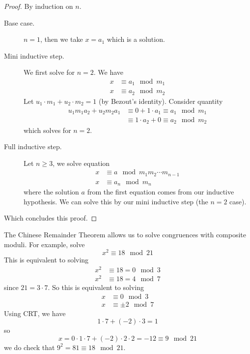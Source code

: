 \begin{proof}
    By induction on $n$.
    \begin{description}
        \item[Base case.] $n = 1$, then we take $x = a_1$ which is a solution.
        \item[Mini inductive step.] We first solve for $n=2$. We have
            \begin{align*}
                x & \equiv a_1\mod m_1 \\
                x & \equiv a_2\mod m_2
            \end{align*}
            Let $u_1\cdot m_1 + u_2\cdot m_2 = 1$ (by Bezout's identity). Consider quantity
            \begin{align*}
                u_1m_1a_2 + u_2m_2a_1 & \equiv 0 + 1\cdot a_1 \equiv a_1 \mod m_1 \\
                                      & \equiv 1\cdot a_2 + 0 \equiv a_2\mod m_2
            \end{align*}
            which solves for $n=2$.
        \item[Full inductive step.] Let $n\geq 3$, we solve equation
            \begin{align*}
                x & \equiv a\mod m_1m_2\cdots m_{n-1} \\
                x & \equiv a_{n}\mod m_{n}
            \end{align*}
            where the solution $a$ from the first equation comes from our inductive hypothesis. We can solve this by our mini inductive step (the $n=2$ case).
    \end{description}
    Which concludes this proof.
\end{proof}

\begin{example}
    The Chinese Remainder Theorem allows us to solve congruences with composite moduli. For example, solve
    \[x^2\equiv 18 \mod 21\]
    This is equivalent to solving
    \begin{align*}
        x^2 & \equiv 18 = 0\mod 3 \\
        x^2 & \equiv 18 = 4\mod 7
    \end{align*}
    since $21 = 3\cdot 7$. So this is equivalent to solving
    \begin{align*}
        x & \equiv 0\mod 3     \\
        x & \equiv \pm 2\mod 7
    \end{align*}
    Using CRT, we have
    \[1\cdot 7 + (-2)\cdot 3 = 1\]
    so
    \[x = 0\cdot 1\cdot 7 + (-2)\cdot 2\cdot 2 = -12 \equiv 9\mod 21\]
    we do check that $9^2 = 81\equiv 18\mod 21$.
\end{example}

